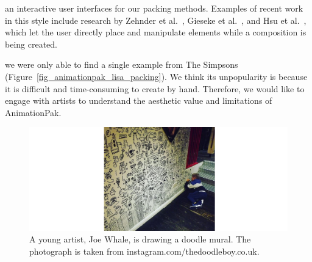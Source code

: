 
 an interactive user interfaces for our packing methods.
Examples of recent work in this style include research
by Zehnder et al.~\cite{Zehnder2016}, Gieseke et al.~\cite{Gieseke2017}, 
and Hsu et al.~\cite{Hsu2020}, which let the user directly place and manipulate
elements while a composition is being created.

we were only able to find a single example from The Simpsons (Figure~\ref{fig_animationpak_lisa_packing}). 
We think its unpopularity is because it is difficult and time-consuming to create by hand.
Therefore, we would like to engage with artists to understand the aesthetic value and limitations
of AnimationPak.


\begin{figure}
\centering
\includegraphics[width=1.0\textwidth]{figures/conclusions/doodle_boy.pdf}
\caption[A doodle mural by Joe Whale]
{ \label{doodle_boy} 
\nnewtext
{
A young artist, Joe Whale, is drawing a doodle mural. 
The photograph is taken from instagram.com/thedoodleboy.co.uk.
}
}
\end{figure}



